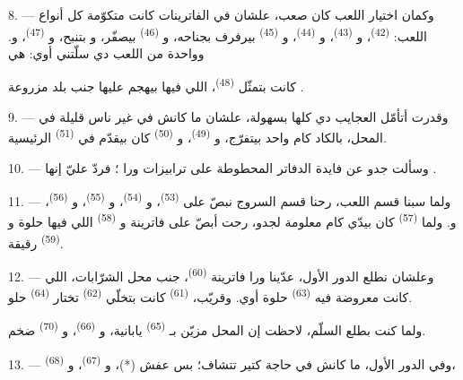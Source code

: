 8. --- وكمان اختيار اللعب كان صعب، علشان في الفاترينات كانت متكوّمة كل أنواع
اللعب:  \textsuperscript{(42)}، و \textsuperscript{(43)}،
و \textsuperscript{(44)}، و \textsuperscript{(45)} بيرفرف
بجناحه، و \textsuperscript{(46)} بيصفّر، و بتنبح،
و \textsuperscript{(47)}، و. وواحدة من اللعب دي
سلّتني أوي: هي


كانت بتمثّل  \textsuperscript{(48)}، اللي فيها  بيهجم
عليها  جنب بلد مزروعة .

9. --- وقدرت أتأمّل العجايب دي كلها بسهولة، علشان ما كانش في غير ناس قليلة في
المحل، بالكاد كام واحد بيتفرّج، و \textsuperscript{(49)}،
و \textsuperscript{(50)} كان بيقدّم  في 
\textsuperscript{(51)} الرئيسية.

10. --- وسألت جدو عن فايدة الدفاتر المحطوطة على ترابيزات ورا ؛
فردّ عليّ إنها .

\VUsaut{3.6mm}
\VUsaut{2.8mm}

11. --- ولما سبنا قسم اللعب، رحنا قسم السروج نبصّ على 
\textsuperscript{(53)}، و \textsuperscript{(54)}، و
\textsuperscript{(55)}، و \textsuperscript{(56)}، و.
ولما  \textsuperscript{(57)} كان بيدّي كام معلومة لجدو، رحت أبصّ
على فاترينة  و \textsuperscript{(58)} اللي فيها
 حلوة و \textsuperscript{(59)} رقيقة.

12. --- وعلشان نطلع الدور الأول، عدّينا ورا فاترينة 
\textsuperscript{(60)}، جنب محل الشرّابات، اللي كانت معروضة فيه
 \textsuperscript{(63)} حلوة أوي. وقريّب، 
\textsuperscript{(61)} كانت بتخلّي  \textsuperscript{(62)} تختار
 \textsuperscript{(64)} حلو.

ولما كنت بطلع السلّم، لاحظت إن المحل مزيّن بـ \textsuperscript{(65)}
يابانية، و \textsuperscript{(66)}، و \textsuperscript{(70)}
ضخم.

13. --- وفي الدور الأول، ما كانش في حاجة كتير تتشاف؛ بس عفش (*)،
و \textsuperscript{(67)}، و \textsuperscript{(68)}،

